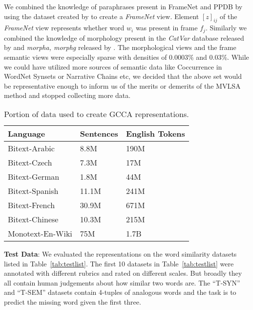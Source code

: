 \documentclass[11pt]{article}
\begin{document}
We combined the knowledge of paraphrases present in FrameNet and PPDB by
using the dataset created by \cite{rastogi2014augmenting} to create a
\textit{FrameNet} view. Element $[z]_{ij}$ of the \textit{FrameNet}
view represents whether word $w_i$ was present in frame
$f_j$. Similarly we combined the knowledge of morphology present in
the \textit{CatVar} database released by \cite{habash2003catvar} and
\textit{morpha, morphg} released by \cite{minnen2001applied}.
The morphological views and the frame semantic views were especially
sparse with densities of 0.0003\% and 0.03\%. While we could have utilized more sources of semantic data like
Coccurrence in WordNet Synsets or Narrative Chains etc, we decided
that the above set would be representative enough to inform us of the
merits or demerits of the MVLSA method and stopped collecting more data.

\begin{table}[htbp]
  \centering
  \begin{tabular}{lll}
    Language & Sentences & English Tokens \\
    \hline
    Bitext-Arabic   & 8.8M   & 190M  \\
    Bitext-Czech    & 7.3M   & 17M   \\
    Bitext-German   & 1.8M   & 44M   \\
    Bitext-Spanish  & 11.1M  & 241M  \\
    Bitext-French   & 30.9M  & 671M  \\
    Bitext-Chinese  & 10.3M  & 215M  \\
    Monotext-En-Wiki& 75M    & 1.7B 
  \end{tabular}  
  \caption{Portion of data used to create GCCA representations.}
  \label{tab:dataperlang}
\end{table}

\textbf{Test Data}: We evaluated the representations on the
word similarity datasets listed in Table~\ref{tab:testlist}. The first
10 datasets in Table~\ref{tab:testlist} were annotated with different
rubrics and rated on different scales. But broadly they all
contain human judgements about how similar two words are.
The ``T-SYN'' and ``T-SEM'' datasets contain 4-tuples of
analogous words and the task is to predict the missing word given the
first three.
\end{document}
